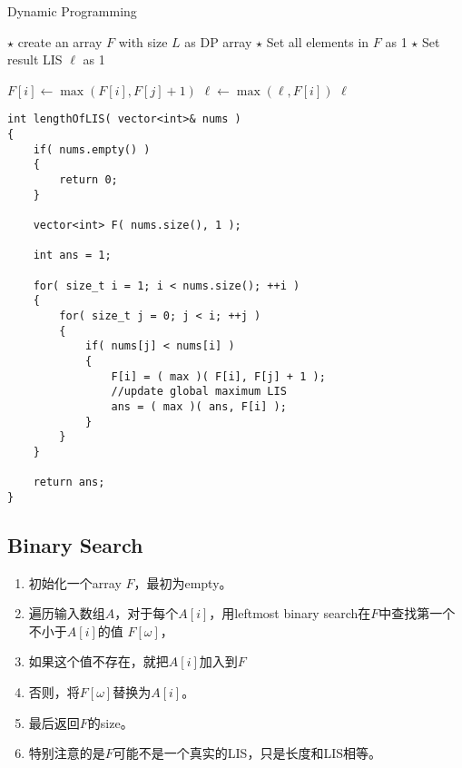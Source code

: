 \setcounter{algorithm}{0}
\begin{algorithm}[H]
\caption{Dynamic Programming}
\begin{algorithmic}[1]
\State $\star$ create an array $F$ with size $L$ as DP array
\State $\star$ Set all elements in $F$ as 1
\State $\star$ Set result LIS $\ell$ as 1
\end{algorithmic}
\end{algorithm}
\begin{algorithm}[H]
\begin{algorithmic}[1]
\State $F[i]\gets \max(F[i], F[j]+1)$
\State $\ell\gets\max(\ell, F[i])$
\EndIf
\EndFor
\EndFor
\State \Return $\ell$
\EndProcedure
\end{algorithmic}
\end{algorithm}

\setcounter{lstlisting}{0}
\begin{lstlisting}[style=customc, caption={Dynamic Programming}]
int lengthOfLIS( vector<int>& nums )
{
    if( nums.empty() )
    {
        return 0;
    }

    vector<int> F( nums.size(), 1 );

    int ans = 1;

    for( size_t i = 1; i < nums.size(); ++i )
    {
        for( size_t j = 0; j < i; ++j )
        {
            if( nums[j] < nums[i] )
            {
                F[i] = ( max )( F[i], F[j] + 1 );
                //update global maximum LIS
                ans = ( max )( ans, F[i] );
            }
        }
    }

    return ans;
}
\end{lstlisting}

\subsection{Binary Search}
\begin{enumerate}
\item 初始化一个array $F$，最初为empty。
\item 遍历输入数组$A$，对于每个$A[i]$，用leftmost binary search在$F$中查找第一个不小于$A[i]$的值 $F[\omega]$，
\item 如果这个值不存在，就把$A[i]$加入到$F$
\item 否则，将$F[\omega]$替换为$A[i]$。
\item 最后返回$F$的size。
\item 特别注意的是$F$可能不是一个真实的LIS，只是长度和LIS相等。
\end{enumerate}

